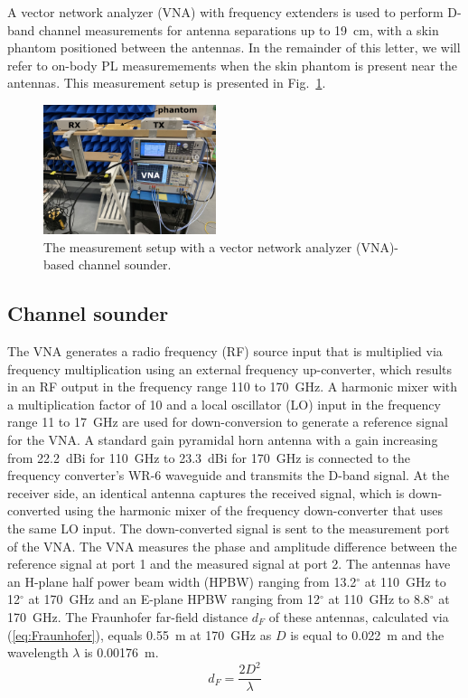 \documentclass[preprint]{rsl}
\begin{document}
A vector network analyzer (VNA) with frequency extenders is used to perform D-band channel measurements for antenna separations up to 19~cm, with a skin phantom positioned between the antennas.
In the remainder of this letter, we will refer to on-body PL measuremements when the skin phantom is present near the antennas. 
This measurement setup is presented in Fig.~\ref{fig:sounder_setup}.
\begin{figure}[tb]
\begin{center}
	\includegraphics[width=0.45\textwidth]{figures/measurement_setup}
\caption{The measurement setup with a vector network analyzer (VNA)-based channel sounder.}
\label{fig:sounder_setup}
\end{center}
\end{figure}

\subsection{Channel sounder}

The VNA generates a radio frequency (RF) source input that is multiplied via frequency multiplication using an external frequency up-converter, which results in an RF output in the frequency range 110 to 170~GHz. 
A harmonic mixer with a multiplication factor of 10 and a local oscillator (LO) input in the frequency range 11 to 17~GHz are used for down-conversion to generate a reference signal for the VNA. 
A standard gain pyramidal horn antenna with a gain increasing from 22.2~dBi for 110~GHz  to 23.3~dBi for 170~GHz is connected to the frequency converter's WR-6 waveguide and transmits the D-band signal.
At the receiver side, an identical antenna captures the received signal, which is down-converted using the harmonic mixer of the frequency down-converter that uses the same LO input. 
The down-converted signal is sent to the measurement port of the VNA. 
The VNA measures the phase and amplitude difference between the reference signal at port 1 and the measured signal at port 2.
The antennas have an H-plane half power beam width (HPBW) ranging from 13.2$^{\circ}$ at 110~GHz to 12$^{\circ}$ at 170~GHz and an E-plane HPBW ranging from 12$^{\circ}$ at 110~GHz to 8.8$^{\circ}$ at 170~GHz. 
The Fraunhofer far-field distance $d_F$ of these antennas, calculated via (\ref{eq:Fraunhofer}), equals 0.55~m at 170~GHz as $D$ is equal to 0.022~m and the wavelength $\lambda$ is 0.00176~m.
\begin{equation}
\label{eq:Fraunhofer}
d_F = \frac{2 D^2}{\lambda}
\end{equation}
\end{document}

